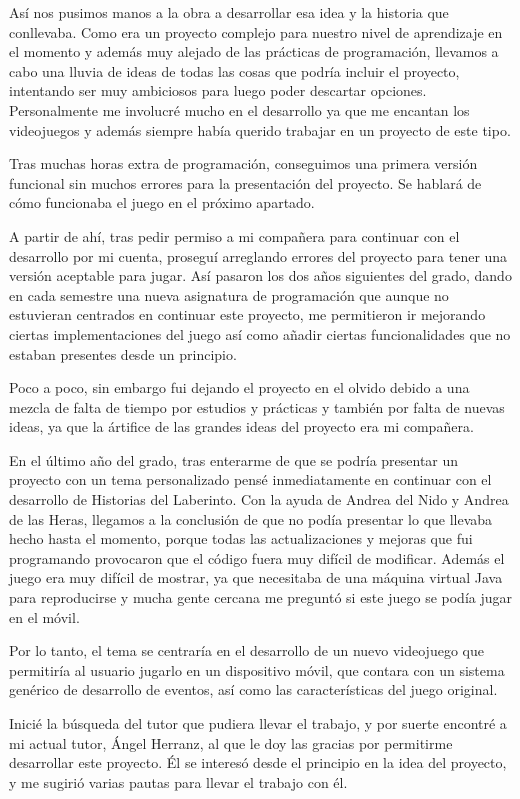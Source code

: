 Así nos pusimos manos a la obra a desarrollar esa idea y la historia que conllevaba. Como era un proyecto complejo para nuestro nivel de aprendizaje en el momento y además muy alejado de las prácticas de programación, llevamos a cabo una lluvia de ideas de todas las cosas que podría incluir el proyecto, intentando ser muy ambiciosos para luego poder descartar opciones.
Personalmente me involucré mucho en el desarrollo ya que me encantan los videojuegos y además siempre había querido trabajar en un proyecto de este tipo.

Tras muchas horas extra de programación, conseguimos una primera versión funcional sin muchos errores para la presentación del proyecto. Se hablará de cómo funcionaba el juego en el próximo apartado.

A partir de ahí, tras pedir permiso a mi compañera para continuar con el desarrollo por mi cuenta, proseguí arreglando errores del proyecto para tener una versión aceptable para jugar.
Así pasaron los dos años siguientes del grado, dando en cada semestre una nueva asignatura de programación que aunque no estuvieran centrados en continuar este proyecto, me permitieron ir mejorando ciertas implementaciones del juego así como añadir ciertas funcionalidades que no estaban presentes desde un principio.

Poco a poco, sin embargo fui dejando el proyecto en el olvido debido a una mezcla de falta de tiempo por estudios y prácticas y también por falta de nuevas ideas, ya que la ártifice de las grandes ideas del proyecto era mi compañera.

En el último año del grado, tras enterarme de que se podría presentar un proyecto con un tema personalizado pensé inmediatamente en continuar con el desarrollo de Historias del Laberinto.
Con la ayuda de Andrea del Nido y Andrea de las Heras, llegamos a la conclusión de que no podía presentar lo que llevaba hecho hasta el momento, porque todas las actualizaciones y mejoras que fui programando provocaron que el código fuera muy difícil de modificar.
Además el juego era muy difícil de mostrar, ya que necesitaba de una máquina virtual Java para reproducirse y mucha gente cercana me preguntó si este juego se podía jugar en el móvil.

Por lo tanto, el tema se centraría en el desarrollo de un nuevo videojuego que permitiría al usuario jugarlo en un dispositivo móvil, que contara con un sistema genérico de desarrollo de eventos, así como las características del juego original.

Inicié la búsqueda del tutor que pudiera llevar el trabajo, y por suerte encontré a mi actual tutor, Ángel Herranz, al que le doy las gracias por permitirme desarrollar este proyecto.
Él se interesó desde el principio en la idea del proyecto, y me sugirió varias pautas para llevar el trabajo con él.

